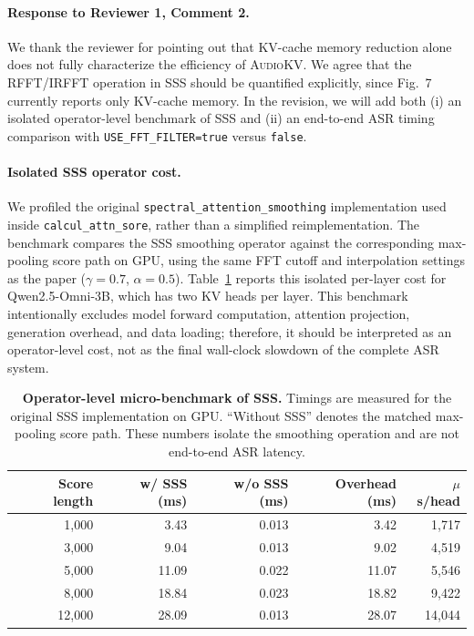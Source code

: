 
\paragraph{Response to Reviewer 1, Comment 2.}
We thank the reviewer for pointing out that KV-cache memory reduction alone does not fully characterize the efficiency of \textsc{AudioKV}.
We agree that the RFFT/IRFFT operation in SSS should be quantified explicitly, since Fig.~7 currently reports only KV-cache memory.
In the revision, we will add both (i) an isolated operator-level benchmark of SSS and (ii) an end-to-end ASR timing comparison with \texttt{USE\_FFT\_FILTER=true} versus \texttt{false}.

\paragraph{Isolated SSS operator cost.}
We profiled the original \texttt{spectral\_attention\_smoothing} implementation used inside \texttt{calcul\_attn\_sore}, rather than a simplified reimplementation.
The benchmark compares the SSS smoothing operator against the corresponding max-pooling score path on GPU, using the same FFT cutoff and interpolation settings as the paper ($\gamma=0.7$, $\alpha=0.5$).
Table~\ref{tab:rebuttal-sss-overhead} reports this isolated per-layer cost for Qwen2.5-Omni-3B, which has two KV heads per layer.
This benchmark intentionally excludes model forward computation, attention projection, generation overhead, and data loading; therefore, it should be interpreted as an operator-level cost, not as the final wall-clock slowdown of the complete ASR system.

\begin{table}[t]
\centering
\footnotesize
\setlength{\tabcolsep}{5pt}
\renewcommand{\arraystretch}{1.08}
\caption{\textbf{Operator-level micro-benchmark of SSS.}
Timings are measured for the original SSS implementation on GPU.
``Without SSS'' denotes the matched max-pooling score path.
These numbers isolate the smoothing operation and are not end-to-end ASR latency.}
\label{tab:rebuttal-sss-overhead}
\begin{tabular}{rrrrr}
\toprule
\textbf{Score length} & \textbf{w/ SSS (ms)} & \textbf{w/o SSS (ms)} & \textbf{Overhead (ms)} & \textbf{$\mu$s/head} \\
\midrule
1{,}000  &  3.43 & 0.013 &  3.42 &  1{,}717 \\
3{,}000  &  9.04 & 0.013 &  9.02 &  4{,}519 \\
5{,}000  & 11.09 & 0.022 & 11.07 &  5{,}546 \\
8{,}000  & 18.84 & 0.023 & 18.82 &  9{,}422 \\
12{,}000 & 28.09 & 0.013 & 28.07 & 14{,}044 \\
\bottomrule
\end{tabular}
\end{table}


